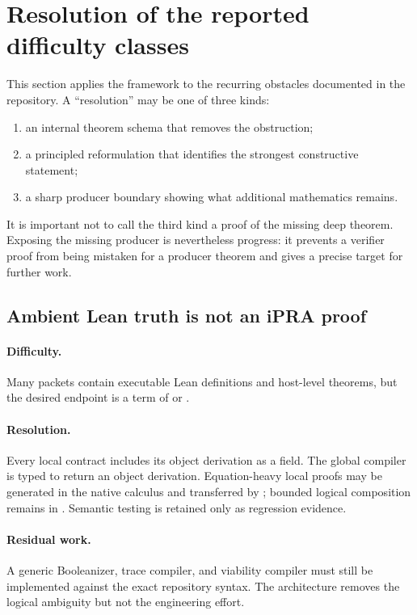 \section{Resolution of the reported difficulty classes}

This section applies the framework to the recurring obstacles documented in the repository.  A ``resolution'' may be one of three kinds:

\begin{enumerate}
  \item an internal theorem schema that removes the obstruction;
  \item a principled reformulation that identifies the strongest constructive statement;
  \item a sharp producer boundary showing what additional mathematics remains.
\end{enumerate}

It is important not to call the third kind a proof of the missing deep theorem.  Exposing the missing producer is nevertheless progress: it prevents a verifier proof from being mistaken for a producer theorem and gives a precise target for further work.

\subsection{Ambient Lean truth is not an iPRA proof}

\paragraph{Difficulty.}
Many packets contain executable Lean definitions and host-level theorems, but the desired endpoint is a term of  or .

\paragraph{Resolution.}
Every local contract includes its object derivation as a field.  The global compiler is typed to return an object derivation.  Equation-heavy local proofs may be generated in the native calculus and transferred by ; bounded logical composition remains in .  Semantic testing is retained only as regression evidence.

\paragraph{Residual work.}
A generic Booleanizer, trace compiler, and viability compiler must still be implemented against the exact repository syntax.  The architecture removes the logical ambiguity but not the engineering effort.

